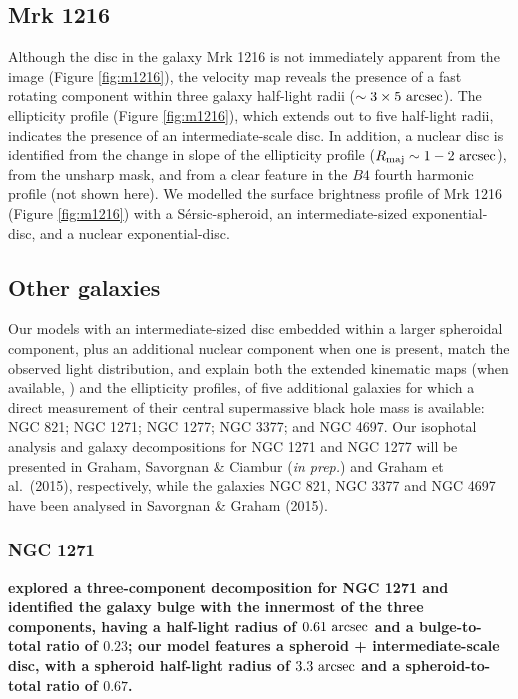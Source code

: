 \documentclass[useAMS,usenatbib,article]{mn2e}
\begin{document}
\subsection{Mrk 1216}
Although the disc in the galaxy Mrk 1216 is not immediately apparent from the image (Figure \ref{fig:m1216}), 
the velocity map \citep{yildirim2015} reveals the presence of a fast rotating component 
within three galaxy half-light radii ($\sim 3 \times 5~\rm arcsec$). 
The ellipticity profile (Figure \ref{fig:m1216}), 
which extends out to five half-light radii, indicates the presence of an intermediate-scale disc. 
In addition, a nuclear disc is identified from the change in slope of the ellipticity profile ($R_{\rm maj} \sim 1 - 2 \rm~arcsec$), 
from the unsharp mask, 
and from a clear feature in the $B4$ fourth harmonic profile (not shown here). 
We modelled the surface brightness profile of Mrk 1216 (Figure \ref{fig:m1216}) with a S\'ersic-spheroid, 
an intermediate-sized exponential-disc, and a nuclear exponential-disc. 

\subsection{Other galaxies}
Our models with an intermediate-sized disc embedded within a larger spheroidal component, 
plus an additional nuclear component when one is present, 
match the observed light distribution, and explain both the extended kinematic maps (when available, \citealt{arnold2014}) and the ellipticity profiles, 
of five additional galaxies for which a direct measurement of their central supermassive black hole mass is available: 
NGC 821; NGC 1271; NGC 1277; NGC 3377; and NGC 4697. 
Our isophotal analysis and galaxy decompositions for NGC 1271 and NGC 1277 will be presented in 
Graham, Savorgnan \& Ciambur (\emph{in prep.}) and Graham et al.~(2015), respectively, 
while the galaxies NGC 821, NGC 3377 and NGC 4697 have been analysed in Savorgnan \& Graham (2015). 

\subsubsection{NGC 1271}
{\bf \cite{walsh2015} explored a three-component decomposition for NGC 1271 
and identified the galaxy bulge with the innermost of the three components, 
having a half-light radius of $0.61~\rm arcsec$ and a bulge-to-total ratio of $0.23$; 
our model features a spheroid + intermediate-scale disc, 
with a spheroid half-light radius of $3.3~\rm arcsec$ and a spheroid-to-total ratio of $0.67$. }
\end{document}
